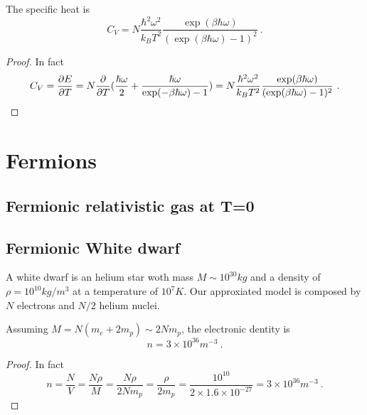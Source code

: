     The specific heat is 
    \begin{equation*}
        C_V = N \frac{\hbar^2 \omega^2}{k_B T^2} \frac{\exp(\beta \hbar \omega)}{(\exp(\beta \hbar \omega) - 1)^2} ~.
    \end{equation*}
    \begin{proof}
        In fact 
        \begin{equation*}
            C_V = \frac{\partial E}{\partial T} = N \frac{\partial}{\partial T} ( \frac{\hbar \omega}{2} + \frac{\hbar \omega}{\exp(- \beta \hbar \omega) - 1} ) = N \frac{\hbar^2 \omega^2}{k_B T^2} \frac{\exp(\beta \hbar \omega)}{(\exp(\beta \hbar \omega) - 1)^2} ~.
        \end{equation*}
    \end{proof}

\chapter{Fermions}

\section{Fermionic relativistic gas at T=0}

\section{Fermionic White dwarf}

    A white dwarf is an helium star woth mass $M \sim 10^{30} kg$ and a density of $\rho = 10^{10} kg/m^3$ at a temperature of $10^{7} K$. Our approxiated model is composed by $N$ electrons and $N/2$ helium nuclei.

    Assuming $M = N(m_e + 2 m_p) \sim 2 N m_p$, the electronic dentity is 
    \begin{equation*}
        n = 3 \times 10^{36} m^{-3} ~.
    \end{equation*}
    \begin{proof}
        In fact 
        \begin{equation*}
            n = \frac{N}{V} = \frac{N \rho}{M} = \frac{N \rho}{2 N m_p} = \frac{\rho}{2 m_p} = \frac{10^{10}}{2 \times 1.6 \times 10^{-27}} = 3 \times 10^{36} m^{-3} ~.
        \end{equation*}
    \end{proof}

